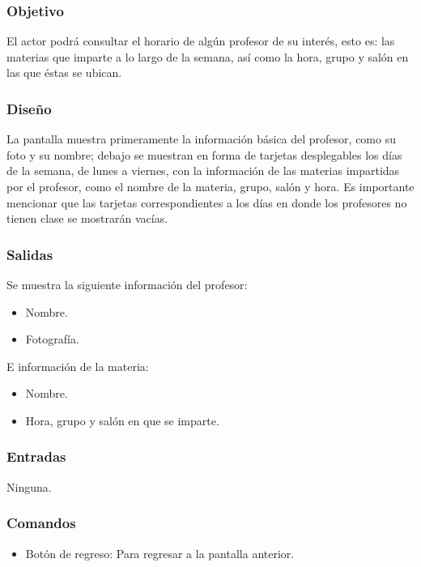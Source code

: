 \subsubsection{Objetivo}
	\noindent
	El actor podrá consultar el horario de algún profesor de su interés, esto es: las materias que imparte a lo largo de la semana, así como la hora, grupo y salón en las que éstas se ubican.

\subsubsection{Diseño}
	\noindent
	La pantalla muestra primeramente la información básica del profesor, como su foto y su nombre; debajo se muestran en forma de tarjetas desplegables los días de la semana, de lunes a viernes, con la información de las materias impartidas por el profesor, como el nombre de la materia, grupo, salón y hora. Es importante mencionar que las tarjetas correspondientes a los días en donde los profesores no tienen clase se mostrarán vacías.

\pagebreak
{}

\subsubsection{Salidas}
	\noindent
	Se muestra la siguiente información del profesor:
	\begin{itemize}
		\item Nombre.
		\item Fotografía. 
	\end{itemize}
	E información de la materia:
	\begin{itemize}
		\item Nombre.
		\item Hora, grupo y salón en que se imparte. 
	\end{itemize}

\subsubsection{Entradas}
	\noindent
	Ninguna.

\subsubsection{Comandos}
\begin{itemize}
	\item Botón de regreso: Para regresar a la pantalla anterior.
\end{itemize}

